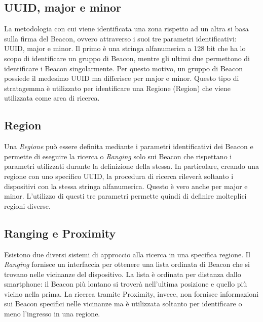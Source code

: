 \subsection{UUID, major e minor}\vspace{5mm}

La metodologia con cui viene identificata una zona rispetto ad un altra si basa sulla firma del Beacon, ovvero attraverso i suoi tre parametri identificativi: UUID, major e minor. Il primo è una stringa alfanumerica a 128 bit che ha lo scopo di identificare un gruppo di Beacon, mentre gli ultimi due permettono di identificare i Beacon singolarmente. Per questo motivo, un gruppo di Beacon possiede il medesimo UUID ma differisce per major e minor. Questo tipo di stratagemma è utilizzato per identificare una Regione (Region) che viene utilizzata come area di ricerca.\vspace{5mm}

\subsection{Region}\vspace{5mm}

Una \emph{Regione} può essere definita mediante i parametri identificativi dei Beacon e permette di eseguire la ricerca o \emph{Ranging} solo sui Beacon che rispettano i parametri utilizzati durante la definizione della stessa. In particolare, creando una regione con uno specifico UUID, la procedura di ricerca rileverà soltanto i dispositivi con la stessa stringa alfanumerica. Questo è vero anche per major e minor. L'utilizzo di questi tre parametri permette quindi di definire molteplici regioni diverse.

\subsection{Ranging e Proximity}\vspace{5mm}

Esistono due diversi sistemi di approccio alla ricerca in una specifica regione. Il \emph{Ranging} fornisce un interfaccia per ottenere una lista ordinata di Beacon che si trovano nelle vicinanze del dispositivo. La lista è ordinata per distanza dallo smartphone: il Beacon più lontano si troverà nell'ultima posizione e quello più vicino nella prima. La ricerca tramite Proximity, invece, non fornisce informazioni sui Beacon specifici nelle vicinanze ma è utilizzata soltanto per identificare o meno l'ingresso in una regione.\vspace{5mm} 

